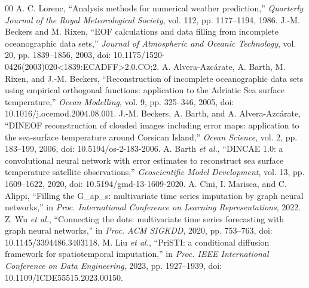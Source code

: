 \documentclass[conference]{IEEEtran}
\begin{document}
\begin{thebibliography}{00}
 A. C. Lorenc, ``Analysis methods for numerical weather
prediction,'' \emph{Quarterly Journal of the Royal Meteorological Society},
vol. 112, pp. 1177--1194, 1986.
 J.-M. Beckers and M. Rixen, ``EOF calculations and data
filling from incomplete oceanographic data sets,'' \emph{Journal of Atmospheric
and Oceanic Technology}, vol. 20, pp. 1839--1856, 2003,
doi: 10.1175/1520-0426(2003)020<1839:ECADFF>2.0.CO;2.
 A. Alvera-Azc{\'a}rate, A. Barth, M. Rixen, and
J.-M. Beckers, ``Reconstruction of incomplete oceanographic data sets using
empirical orthogonal functions: application to the Adriatic Sea surface
temperature,'' \emph{Ocean Modelling}, vol. 9, pp. 325--346, 2005,
doi: 10.1016/j.ocemod.2004.08.001.
 J.-M. Beckers, A. Barth, and A. Alvera-Azc{\'a}rate,
``DINEOF reconstruction of clouded images including error maps: application to
the sea-surface temperature around Corsican Island,'' \emph{Ocean Science},
vol. 2, pp. 183--199, 2006, doi: 10.5194/os-2-183-2006.
 A. Barth \emph{et al.}, ``DINCAE 1.0: a convolutional
neural network with error estimates to reconstruct sea surface temperature
satellite observations,'' \emph{Geoscientific Model Development}, vol. 13,
pp. 1609--1622, 2020, doi: 10.5194/gmd-13-1609-2020.
 A. Cini, I. Marisca, and C. Alippi, ``Filling the G\_ap\_s:
multivariate time series imputation by graph neural networks,'' in
\emph{Proc. International Conference on Learning Representations}, 2022.
 Z. Wu \emph{et al.}, ``Connecting the dots: multivariate
time series forecasting with graph neural networks,'' in \emph{Proc. ACM
SIGKDD}, 2020, pp. 753--763, doi: 10.1145/3394486.3403118.
 M. Liu \emph{et al.}, ``PriSTI: a conditional diffusion
framework for spatiotemporal imputation,'' in \emph{Proc. IEEE International
Conference on Data Engineering}, 2023, pp. 1927--1939,
doi: 10.1109/ICDE55515.2023.00150.
\end{thebibliography}
\end{document}
